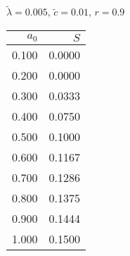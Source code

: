 \documentclass[11pt,a4paper]{article}
\begin{document}
\begin{minipage}[t]{\textwidth}
\begin{minipage}[t]{0.32\textwidth}
        \footnotesize
        \begin{flushleft}$\tilde{\lambda}=0.005$, $\tilde{c}=0.01$, $r=0.9$\end{flushleft}
        \begin{tabular}[t]{rr}
            $a_0$ & $S$ \\
            \hline
             0.100 & 0.0000 \\
             0.200 & 0.0000 \\
             0.300 & 0.0333 \\
             0.400 & 0.0750 \\
             0.500 & 0.1000 \\
             0.600 & 0.1167 \\
             0.700 & 0.1286 \\
             0.800 & 0.1375 \\
             0.900 & 0.1444 \\
             1.000 & 0.1500 \\
        \end{tabular}
    \end{minipage}
\end{minipage}
\end{document}

